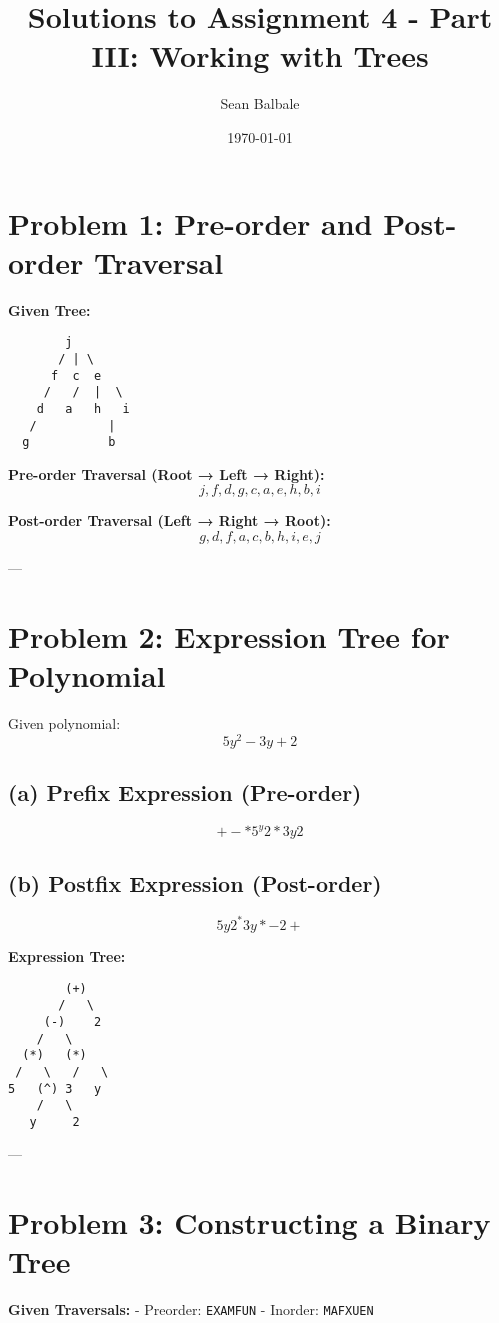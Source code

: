 \documentclass{article}
\title{Solutions to Assignment 4 - Part III: Working with Trees}
\author{Sean Balbale}
\date{\today}
\begin{document}
\maketitle
\newpage
\section{Problem 1: Pre-order and Post-order Traversal}

\textbf{Given Tree:}
\begin{verbatim}
        j
       / | \
      f  c  e
     /   /  |  \
    d   a   h   i
   /          |
  g           b
\end{verbatim}

\textbf{Pre-order Traversal (Root → Left → Right):}
\[
j, f, d, g, c, a, e, h, b, i
\]

\textbf{Post-order Traversal (Left → Right → Root):}
\[
g, d, f, a, c, b, h, i, e, j
\]

---

\section{Problem 2: Expression Tree for Polynomial}

Given polynomial:
\[
5y^2 - 3y + 2
\]

\subsection{(a) Prefix Expression (Pre-order)}
\[
+ - * 5 ^ y 2 * 3 y 2
\]

\subsection{(b) Postfix Expression (Post-order)}
\[
5 y 2 ^ * 3 y * - 2 +
\]

\textbf{Expression Tree:}
\begin{verbatim}
        (+)
       /   \
     (-)    2
    /   \
  (*)   (*)
 /   \   /   \
5   (^) 3   y
    /   \
   y     2
\end{verbatim}

---

\section{Problem 3: Constructing a Binary Tree}

\textbf{Given Traversals:}
- Preorder: \texttt{EXAMFUN}
- Inorder: \texttt{MAFXUEN}
\end{document}
